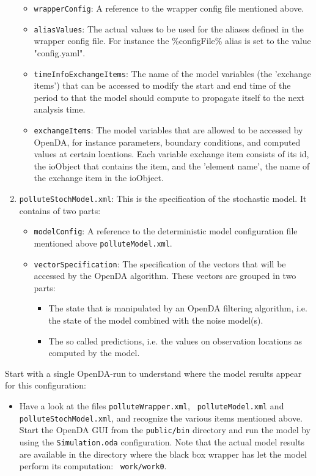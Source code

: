 \begin{enumerate}
\begin{itemize}
        \item {\tt wrapperConfig}: A reference to the wrapper config file
          mentioned above.
        \item {\tt aliasValues}: The actual values to be used for the aliases
          defined in the wrapper config file. For instance the \%configFile\%
          alias is set to the value "config.yaml".
        \item {\tt timeInfoExchangeItems}: The name of the model variables (the
          'exchange items') that can be accessed to modify the start and end
          time of the period to that the model should compute to propagate
          itself to the next analysis time.
        \item {\tt exchangeItems}: The model variables that are allowed to be
          accessed by OpenDA, for instance parameters, boundary conditions, and
          computed values at certain locations. Each variable exchange item
          consists of its id, the ioObject that contains the item, and the
          'element name', the name of the exchange item in the ioObject.
     \end{itemize}
   \item {\tt polluteStochModel.xml}: This is the specification of the
     stochastic model. It contains of two parts:
     \begin{itemize}
        \item {\tt modelConfig}: A reference to the deterministic model
          configuration file mentioned above {\tt polluteModel.xml}.
        \item {\tt vectorSpecification}: The specification of the vectors that
          will be accessed by the OpenDA algorithm. These vectors are grouped
          in two parts:
          \begin{itemize}
             \item The state that is manipulated by an OpenDA filtering
               algorithm, i.e. the state of the model combined with the noise
               model(s).
             \item The so called predictions, i.e. the values on observation
               locations as computed by the model.
          \end{itemize}
     \end{itemize}
\end{enumerate}

Start with a single OpenDA-run to understand where the model results appear
for this configuration:
\begin{itemize}
 \item Have a look at the files {\tt polluteWrapper.xml}, {\tt
   polluteModel.xml} and {\tt polluteStochModel.xml}, and recognize the various
   items mentioned above. Start the OpenDA GUI from the {\tt public/bin}
   directory and run the model by using the {\tt Simulation.oda} configuration.
   Note that the actual model results are available in the directory where the
   black box wrapper has let the model perform its computation: {\tt
     work/work0}.
\end{itemize}
